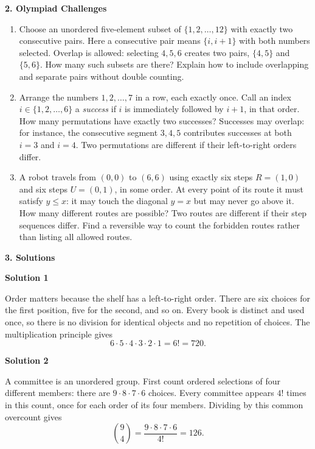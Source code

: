 \documentclass[11pt]{article}
\newcommand{\stageheading}[1]{%
  \par\Needspace{6\baselineskip}%
  \addvspace{.65\baselineskip}%
  {\centering\large\bfseries #1\par}%
  \nopagebreak[4]}
\newcommand{\solution}[1]{%
  \par\Needspace{5\baselineskip}\addvspace{.8\baselineskip}%
  {\large\bfseries Solution #1\par}\nopagebreak[4]}
\begin{document}
\stageheading{2. Olympiad Challenges}
\begin{enumerate}[label=\textbf{\arabic*.},start=9]
\item Choose an unordered five-element subset of $\{1,2,\ldots,12\}$
with exactly two consecutive pairs. Here a consecutive pair means
$\{i,i+1\}$ with both numbers selected. Overlap is allowed: selecting
$4,5,6$ creates two pairs, $\{4,5\}$ and $\{5,6\}$.
How many such subsets are there? Explain how to include overlapping
and separate pairs without double counting.

\item Arrange the numbers $1,2,\ldots,7$ in a row, each exactly once.
Call an index $i\in\{1,2,\ldots,6\}$ a \emph{success} if $i$ is
immediately followed by $i+1$, in that order. How many permutations
have exactly two successes? Successes may overlap: for instance,
the consecutive segment $3,4,5$ contributes successes at both $i=3$
and $i=4$. Two permutations are different if their left-to-right orders differ.

\item A robot travels from $(0,0)$ to $(6,6)$ using exactly six steps
$R=(1,0)$ and six steps $U=(0,1)$, in some order. At every point of
its route it must satisfy $y\leq x$: it may touch the diagonal $y=x$
but may never go above it. How many different routes are possible?
Two routes are different if their step sequences differ. Find a
reversible way to count the forbidden routes rather than listing all
allowed routes.
\end{enumerate}

\clearpage
\endgroup
\restoregeometry
\stageheading{3. Solutions}

\solution{1}
Order matters because the shelf has a left-to-right order. There are six
choices for the first position, five for the second, and so on. Every
book is distinct and used once, so there is no division for identical
objects and no repetition of choices. The multiplication principle gives
 \vspace{-3mm}
\[
6\cdot5\cdot4\cdot3\cdot2\cdot1=6!=\boxed{720}.
\]
\vspace{-12mm}



\solution{2}
A committee is an unordered group. First count ordered selections of
four different members: there are $9\cdot8\cdot7\cdot6$ choices.
Every committee appears $4!$ times in this count, once for each order of
its four members. Dividing by this common overcount gives
\[
\binom94=\frac{9\cdot8\cdot7\cdot6}{4!}=\boxed{126}.
\]
\end{document}
